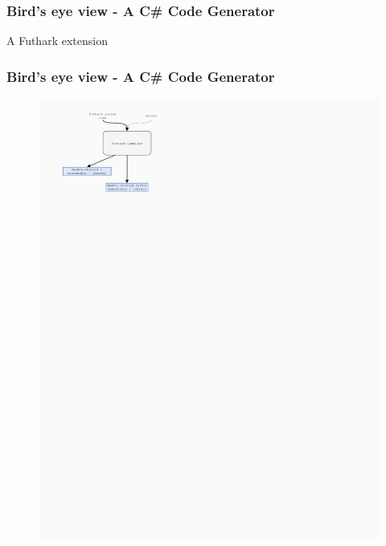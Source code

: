 \documentclass[10pt, compress]{beamer}
\begin{document}
\begin{frame}[plain,c]
\frametitle{Bird's eye view - A C\# Code Generator}
\begin{center}
  \Huge A Futhark extension
\end{center}
\end{frame}

\begin{frame}[fragile]
  \frametitle{Bird's eye view - A C\# Code Generator}
    \begin{figure}
      \begin{overprint}
        \includegraphics{./images/futhark_diagram_before.pdf}

\end{overprint}
\end{figure}
\end{frame}
\end{document}
